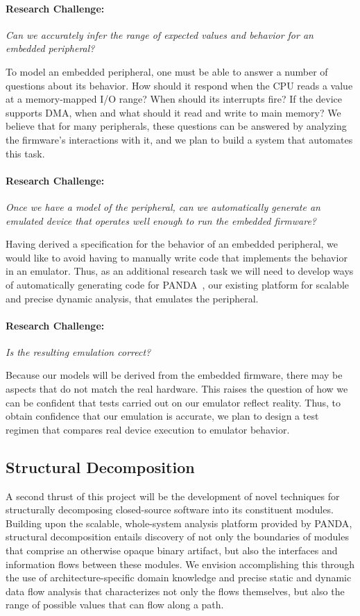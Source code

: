 \documentclass[letterpaper,twoside,11pt,headings=small]{scrartcl}
\newcommand{\dynamicsys}{\textsc{PANDA}\xspace}
\newcommand{\challenge}[1]{\paragraph{Research Challenge:} \emph{#1}}
\begin{document}
\challenge{Can we accurately infer the range of expected values and
behavior for an embedded peripheral?}

To model an embedded peripheral, one must be able to answer a number of
questions about its behavior. How should it respond when the CPU reads a value
at a memory-mapped I/O range? When should its interrupts fire? If the device
supports DMA, when and what should it read and write to main memory? We
believe that for many peripherals, these questions can be answered by
analyzing the firmware's interactions with it, and we plan to build a system
that automates this task.

\challenge{Once we have a model of the peripheral, can we automatically
generate an emulated device that operates well enough to run the embedded firmware?}

Having derived a specification for the behavior of an embedded peripheral, we
would like to avoid having to manually write code that implements the behavior
in an emulator. Thus, as an additional research task we will need to develop
ways of automatically generating code for \dynamicsys~\cite{panda}, our
existing platform for scalable and precise dynamic analysis, that emulates the
peripheral.

\challenge{Is the resulting emulation correct?}

Because our models will be derived from the embedded firmware, there may be
aspects that do not match the real hardware. This raises the question of how
we can be confident that tests carried out on our emulator reflect reality.
Thus, to obtain confidence that our emulation is accurate, we plan to design a
test regimen that compares real device execution to emulator behavior.

\subsection{Structural Decomposition}
\label{sec:overview:structure}

A second thrust of this project will be the development of novel techniques
for structurally decomposing closed-source software into its constituent
modules.  Building upon the scalable, whole-system analysis platform provided
by \dynamicsys, structural decomposition entails discovery of not only the
boundaries of modules that comprise an otherwise opaque binary artifact, but
also the interfaces and information flows between these modules.  We envision
accomplishing this through the use of architecture-specific domain knowledge
and precise static and dynamic data flow analysis that characterizes not only
the flows themselves, but also the range of possible values that can flow along
a path.
\end{document}
